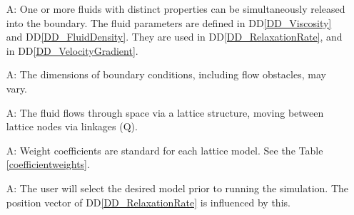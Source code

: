 \documentclass[12pt]{article}
\newcounter{assumpnum} %
\begin{document}
\begin{itemize}

\item[A\refstepcounter{assumpnum}\theassumpnum \label{A_fluids}:]
  One or more fluids with distinct properties can be simultaneously released into the boundary. The fluid parameters are defined in
  DD\ref{DD_Viscosity} and DD\ref{DD_FluidDensity}. They are used in
  DD\ref{DD_RelaxationRate}, and in DD\ref{DD_VelocityGradient}.
  
\item[A\refstepcounter{assumpnum}\theassumpnum \label{A_flowObject}:]
  The dimensions of boundary conditions, including flow obstacles, may vary.
  
\item[A\refstepcounter{assumpnum}\theassumpnum \label{A_lattice}:]
  The fluid flows through space via a lattice structure, moving between lattice
  nodes via linkages ($\mathrm{Q}$). 

  
\item[A\refstepcounter{assumpnum}\theassumpnum \label{A_weightCoefficients}:]
  Weight coefficients are standard for each lattice model. See the Table
  \ref{coefficientweights}.  

\item[A\refstepcounter{assumpnum}\theassumpnum \label{A_selectModel}:] The user
  will select the desired model prior to running the simulation. The position
  vector of DD\ref{DD_RelaxationRate} is influenced by this.

\end{itemize}
\end{document}
